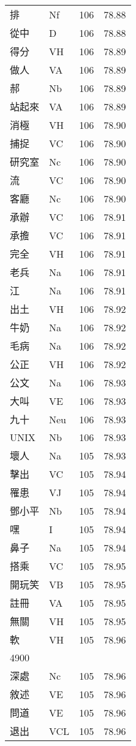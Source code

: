 \documentclass[twocolumn]{book}
\begin{document}
\begin{supertabular}{llrr}
排 & Nf & 106 &  78.88\\
從中 & D & 106 &  78.88\\
得分 & VH & 106 &  78.89\\
做人 & VA & 106 &  78.89\\
郝 & Nb & 106 &  78.89\\
站起來 & VA & 106 &  78.89\\
消極 & VH & 106 &  78.90\\
捕捉 & VC & 106 &  78.90\\
研究室 & Nc & 106 &  78.90\\
流 & VC & 106 &  78.90\\
客廳 & Nc & 106 &  78.90\\
承辦 & VC & 106 &  78.91\\
承擔 & VC & 106 &  78.91\\
完全 & VH & 106 &  78.91\\
老兵 & Na & 106 &  78.91\\
江 & Na & 106 &  78.91\\
出土 & VH & 106 &  78.92\\
牛奶 & Na & 106 &  78.92\\
毛病 & Na & 106 &  78.92\\
公正 & VH & 106 &  78.92\\
公文 & Na & 106 &  78.93\\
大叫 & VE & 106 &  78.93\\
九十 & Neu & 106 &  78.93\\
UNIX & Nb & 106 &  78.93\\
壞人 & Na & 105 &  78.93\\
擊出 & VC & 105 &  78.94\\
罹患 & VJ & 105 &  78.94\\
鄧小平 & Nb & 105 &  78.94\\
嘿 & I & 105 &  78.94\\
鼻子 & Na & 105 &  78.94\\
搭乘 & VC & 105 &  78.95\\
開玩笑 & VB & 105 &  78.95\\
註冊 & VA & 105 &  78.95\\
無關 & VH & 105 &  78.95\\
軟 & VH & 105 &  78.96\\
4900\\
深處 & Nc & 105 &  78.96\\
敘述 & VE & 105 &  78.96\\
問道 & VE & 105 &  78.96\\
退出 & VCL & 105 &  78.96\\

\end{supertabular}
\end{document}

